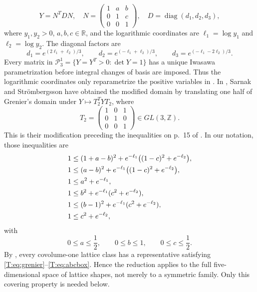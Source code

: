 \documentclass[reqno,english]{amsart}
\theoremstyle{definition}
\newtheorem{open problem}[theorem]{Open Problem}
\theoremstyle{remark}
\theoremstyle{plain}
\newcommand{\R}{{\mathbb R}}
\numberwithin{equation}{section}
\newcommand{\Z}{\mathbb Z}
\newcommand{\PP}{\mathcal P_3^1}
\newcommand{\calP}{\PP}
\newcommand{\diag}{\operatorname{diag}}
\begin{document}
\begin{equation}\label{T:eq:iwasawa}
 Y=N^TDN,\quad
 N=\begin{pmatrix}1&a&b\\0&1&c\\0&0&1\end{pmatrix},\quad
 D=\diag(d_1,d_2,d_3),
\end{equation}
where $y_1,y_2>0$, $a,b,c\in\R$, and the logarithmic coordinates are
$\ell_1=\log y_1$ and $\ell_2=\log y_2$. The diagonal factors are
\begin{equation}\label{T:eq:di}
 d_1=e^{(2\ell_1+\ell_2)/3},\qquad
 d_2=e^{(-\ell_1+\ell_2)/3},\qquad
 d_3=e^{(-\ell_1-2\ell_2)/3}.
\end{equation}
Every matrix in $\calP=\{Y=Y^T>0:\det Y=1\}$ has a unique Iwasawa
parametrization before integral changes of basis are imposed. Thus the
logarithmic coordinates only reparametrize the positive variables in
\cite[(27)]{SS}. In \cite{SS}, Sarnak and Str\"ombergsson have obtained the modified domain
by translating one half of Grenier's domain under
$Y\mapsto T_2^TYT_2$, where
\[
 T_2=\begin{pmatrix}1&0&1\\0&1&0\\0&0&1\end{pmatrix}\in GL(3,\Z).
\]
This is their modification preceding the inequalities on p.~15 of
\cite{SS}. In our notation, those inequalities are
\begin{align}\label{T:eq:grenier}
 1&\le(1+a-b)^2+e^{-\ell_1}\bigl((1-c)^2+e^{-\ell_2}\bigr),\notag\\
 1&\le(a-b)^2+e^{-\ell_1}\bigl((1-c)^2+e^{-\ell_2}\bigr),\notag\\
 1&\le a^2+e^{-\ell_1},\notag\\
 1&\le b^2+e^{-\ell_1}(c^2+e^{-\ell_2}),\\
 1&\le(b-1)^2+e^{-\ell_1}(c^2+e^{-\ell_2}),\notag\\
 1&\le c^2+e^{-\ell_2},\notag
\end{align}
with
\begin{equation}\label{T:eq:abcbox}
 0\le a\le\frac12,\qquad0\le b\le1,\qquad0\le c\le\frac12.
\end{equation}
By \cite[Section~4, p.~15]{SS}, every covolume-one lattice class has a
representative satisfying \eqref{T:eq:grenier}--\eqref{T:eq:abcbox}.
Hence the reduction applies to the full five-dimensional space of
lattice shapes, not merely to a symmetric family. Only this covering
property is needed below.
\end{document}
